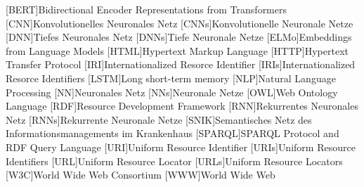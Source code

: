 \begin{acronym}
[BERT]{Bidirectional Encoder Representations from Transformers}
[CNN]{Konvolutionelles Neuronales Netz}
[CNNs]{Konvolutionelle Neuronale Netze}
[DNN]{Tiefes Neuronales Netz}
[DNNs]{Tiefe Neuronale Netze}
[ELMo]{Embeddings from Language Models}
[HTML]{Hypertext Markup Language}
[HTTP]{Hypertext Transfer Protocol}
[IRI]{Internationalized Resorce Identifier}
[IRIs]{Internationalized Resorce Identifiers}
[LSTM]{Long short-term memory}
[NLP]{Natural Language Processing}
[NN]{Neuronales Netz}
[NNs]{Neuronale Netze}
[OWL]{Web Ontology Language}
[RDF]{Resource Development Framework}
[RNN]{Rekurrentes Neuronales Netz}
[RNNs]{Rekurrente Neuronale Netze}
[SNIK]{Semantisches Netz des Informationsmanagements im Krankenhaus}
[SPARQL]{SPARQL Protocol and RDF Query Language}
[URI]{Uniform Resource Identifier}
[URIs]{Uniform Resource Identifiers}
[URL]{Uniform Resource Locator}
[URLs]{Uniform Resource Locators}
[W3C]{World Wide Web Consortium}
[WWW]{World Wide Web}
\end{acronym}
